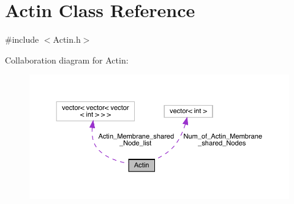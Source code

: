 \hypertarget{classActin}{}\section{Actin Class Reference}
\label{classActin}


{\ttfamily \#include $<$Actin.\+h$>$}



Collaboration diagram for Actin\+:
\nopagebreak
\begin{figure}[H]
\begin{center}
\leavevmode
\includegraphics[width=350pt]{classActin__coll__graph}
\end{center}
\end{figure}

